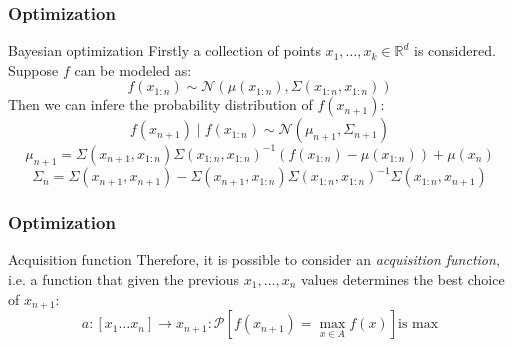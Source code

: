     \begin{frame}
        \frametitle{Optimization}
        \vskip -0.5cm
        \begin{block}{Bayesian optimization}
            Firstly a collection of points $x_1, \ldots, x_k \in \mathbb{R}^d$ is considered. Suppose $f$ can be modeled as:
            \begin{equation*}
                f\left(x_{1:n}\right) \sim \mathcal{N}\left(\mu\left(x_{1:n}\right), \Sigma\left(x_{1:n}, x_{1:n}\right)\right)
            \end{equation*}
            Then we can infere the probability distribution of $f\left(x_{n+1}\right)$:
            \begin{equation}
                f\left(x_{n+1}\right) \mid f\left(x_{1:n}\right) \sim \mathcal{N}\left(\mu_{n+1}, \Sigma_{n+1}\right)
            \end{equation}
            \begin{equation*}
                \mu_{n+1} = \Sigma\left(x_{n+1}, x_{1:n}\right)\Sigma\left(x_{1:n}, x_{1:n}\right)^{-1}\left(f\left(x_{1:n}\right) - \mu\left(x_{1:n}\right)\right) + \mu\left(x_{n}\right)
            \end{equation*}
            \begin{equation*}
                \Sigma_n = \Sigma\left(x_{n+1}, x_{n+1}\right) - \Sigma\left(x_{n+1}, x_{1:n}\right)\Sigma\left(x_{1:n}, x_{1:n}\right)^{-1}\Sigma\left(x_{1:n}, x_{n+1}\right)
            \end{equation*}
        \end{block}
    \end{frame}
    
    \begin{frame}
        \frametitle{Optimization}
        \begin{exampleblock}{Acquisition function}
            Therefore, it is possible to consider an \emph{acquisition function}, i.e. a function that given the previous $x_1, \ldots, x_n$ values determines the best choice of $x_{n+1}$:
            \begin{equation}
                a \colon \left[x_1 \ldots x_n\right] \rightarrow x_{n+1} \colon \mathcal{P}\left[f(x_{n+1}) = \max\limits_{x \in A} f\left(x\right)\right] \text{is max}
            \end{equation}
        \end{exampleblock}
    \end{frame}